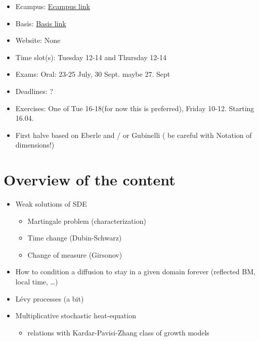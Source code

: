 \begin{tcolorbox}[enhanced,breakable,
	title=General Information,frame style={color=mycolor}]
    \begin{itemize}
        \item Ecampus: \href{https://ecampus.uni-bonn.de/goto.php?target=crs_3330449}{Ecampus link}
        \item Basis: \href{https://basis.uni-bonn.de/qisserver/rds?state=verpublish&status=init&vmfile=no&publishid=239886&moduleCall=webInfo&publishConfFile=webInfo&publishSubDir=veranstaltung}{Basis link}
        \item Website: None
        \item Time slot(s): Tuesday 12-14 and Thursday 12-14
        \item Exams: Oral: 23-25 July, 30 Sept. maybe 27. Sept
        \item Deadlines: ?
        \item Exercises: One of Tue 16-18(for now this is preferred), Friday 10-12. Starting 16.04.
    \end{itemize}
\end{tcolorbox}



\begin{itemize}
    \item {}First halve based on Eberle and / or Gubinelli ( be careful with Notation of dimensions!)
\end{itemize}

\section*{Overview of the content}

\begin{itemize}
    \item Weak solutions of SDE \begin{itemize}
        \item Martingale problem (characterization)
        \item Time change (Dubin-Schwarz)
        \item Change of measure (Girsonov)
    \end{itemize}
    \item How to condition a diffusion to stay in a given domain forever (reflected BM, local time, \dots)
    \item Lévy processes (a bit)
    \item Multiplicative stochastic heat-equation\begin{itemize}
        \item relations with Kardar-Pavisi-Zhang class of growth models
    \end{itemize}
\end{itemize}
